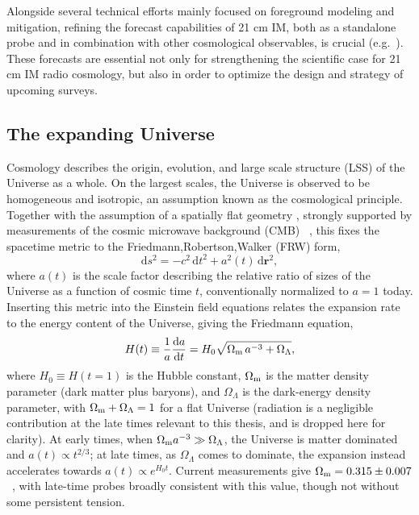 Alongside several technical efforts mainly focused on foreground modeling and mitigation, refining the forecast capabilities of 21 cm IM, both as a standalone probe and in combination with other cosmological observables, is crucial (e.g.~\citep{carucci_cross-correlation_2017,berti_21cm_2023,berti24}). These forecasts are essential not only for strengthening the scientific case for 21 cm IM radio cosmology, but also in order to optimize the design and strategy of upcoming surveys.

\subsection{The expanding Universe}

Cosmology describes the origin, evolution, and large scale structure (LSS) of the Universe as a whole. On the largest scales, the Universe is observed to be homogeneous and isotropic, an assumption known as the cosmological principle. Together with the assumption of a spatially flat geometry , strongly supported by measurements of the cosmic microwave background (CMB)~\citep{planck:2018} , this fixes the spacetime metric to the Friedmann,Robertson,Walker (FRW) form,
\begin{equation}
    \text{d}s^2 = -c^2\,\text{d}t^2 + a^2(t)\,\text{d}\bm{r}^2,
\end{equation}
where $a(t)$ is the scale factor describing the relative  ratio of sizes of the Universe as a function of cosmic time $t$, conventionally normalized to $a=1$ today. Inserting this metric into the Einstein field equations relates the expansion rate to the energy content of the Universe, giving the Friedmann equation,
\begin{equation}
    H(t) \equiv \frac{1}{a}\frac{\text{d}a}{\text{d}t} = H_0\sqrt{\Omega_\mathrm{m}\,a^{-3} + \Omega_\Lambda},
\end{equation}
where $H_0\equiv H(t=1)$ is the Hubble constant, $\Omega_\mathrm{m}$ is the matter density parameter (dark matter plus baryons), and $\Omega_\Lambda$ is the dark-energy density parameter, with $\Omega_\mathrm{m}+\Omega_\Lambda=1$ for a flat Universe (radiation is a negligible contribution at the late times relevant to this thesis, and is dropped here for clarity). At early times, when $\Omega_\mathrm{m} a^{-3}\gg\Omega_\Lambda$, the Universe is matter dominated and $a(t)\propto t^{2/3}$; at late times, as $\Omega_\Lambda$ comes to dominate, the expansion instead accelerates towards $a(t)\propto e^{H_0 t}$. Current measurements give $\Omega_\mathrm{m}=0.315\pm0.007$~\citep{planck:2018}, with late-time probes broadly consistent with this value, though not without some persistent tension.

